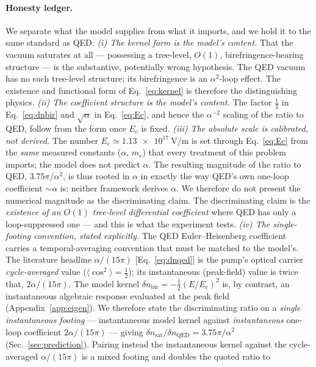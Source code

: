 \documentclass[aps,prd,twocolumn,superscriptaddress,nofootinbib,longbibliography]{revtex4-2}
\newcommand{\Ec}{E_{\mathrm{c}}}
\newcommand{\dnbir}{\delta n_{\mathrm{bir}}}
\newcommand{\dnsat}{\delta n_{\mathrm{sat}}}
\begin{document}
\paragraph*{Honesty ledger.}
We separate what the model supplies from what it imports, and we hold it to the
same standard as QED.
\emph{(i) The kernel form is the model's content.} That the vacuum saturates at
all --- possessing a tree-level, $O(1)$, birefringence-bearing structure --- is
the substantive, potentially wrong hypothesis. The QED vacuum has no such
tree-level structure; its birefringence is an $\alpha^2$-loop effect. The
existence and functional form of Eq.~\eqref{eq:kernel} is therefore the
distinguishing physics.
\emph{(ii) The coefficient structure is the model's content.} The factor
$\tfrac12$ in Eq.~\eqref{eq:dnbir} and $\sqrt\alpha$ in Eq.~\eqref{eq:Ec}, and
hence the $\alpha^{-2}$ scaling of the ratio to QED, follow from the form once
$\Ec$ is fixed.
\emph{(iii) The absolute scale is calibrated, not derived.} The number
$\Ec\simeq\SI{1.13e17}{\volt\per\meter}$ is set through Eq.~\eqref{eq:Ec} from
the \emph{same} measured constants ($\alpha$, $m_e$) that every treatment of
this problem imports; the model does not predict $\alpha$. The resulting
magnitude of the ratio to QED, $3.75\pi/\alpha^2$, is thus rooted in $\alpha$ in
exactly the way QED's own one-loop coefficient $\sim\alpha$ is: neither
framework derives $\alpha$. We therefore do not present the numerical magnitude
as the discriminating claim. The discriminating claim is the \emph{existence of
an $O(1)$ tree-level differential coefficient} where QED has only a
loop-suppressed one --- and this is what the experiment tests.
\emph{(iv) The single-footing convention, stated explicitly.} The QED
Euler--Heisenberg coefficient carries a temporal-averaging convention that must
be matched to the model's. The literature headline $\alpha/(15\pi)$
[Eq.~\eqref{eq:dnqed}] is the pump's optical carrier \emph{cycle-averaged} value
($\langle\cos^2\rangle=\tfrac12$); its instantaneous (peak-field) value is twice
that, $2\alpha/(15\pi)$. The model kernel $\dnbir=-\tfrac12(E/\Ec)^2$ is, by
contrast, an instantaneous algebraic response evaluated at the peak field
(Appendix~\ref{app:eigen}). We therefore state the discriminating ratio on a
\emph{single instantaneous footing} --- instantaneous model kernel against
\emph{instantaneous} one-loop coefficient $2\alpha/(15\pi)$ --- giving
$\dnsat/\delta n_{\mathrm{QED}}=3.75\pi/\alpha^2$ (Sec.~\ref{sec:prediction}).
Pairing instead the instantaneous kernel against the cycle-averaged
$\alpha/(15\pi)$ is a mixed footing and doubles the quoted ratio to
\end{document}
